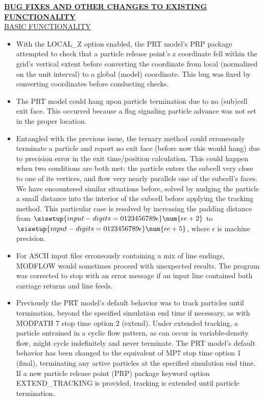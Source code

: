 	\textbf{\underline{BUG FIXES AND OTHER CHANGES TO EXISTING FUNCTIONALITY}} \\
	\underline{BASIC FUNCTIONALITY}
	\begin{itemize}
		\item With the LOCAL\_Z option enabled, the PRT model's PRP package attempted to check that a particle release point's z coordinate fell within the grid's vertical extent before converting the coordinate from local (normalized on the unit interval) to a global (model) coordinate. This bug was fixed by converting coordinates before conducting checks.
		\item The PRT model could hang upon particle termination due to no (sub)cell exit face. This occurred because a flag signaling particle advance was not set in the proper location.
		\item Entangled with the previous issue, the ternary method could erroneously terminate a particle and report no exit face (before now this would hang) due to precision error in the exit time/position calculation. This could happen when two conditions are both met: the particle enters the subcell very close to one of its vertices, and flow very nearly parallels one of the subcell's faces. We have encountered similar situations before, solved by nudging the particle a small distance into the interior of the subcell before applying the tracking method. This particular case is resolved by increasing the padding distance from $\sisetup{input-digits = 0123456789\epsilon} \num{\epsilon e+2}$ to $\sisetup{input-digits = 0123456789\epsilon} \num{\epsilon e+5}$, where $\epsilon$ is machine precision.
		\item For ASCII input files erroneously containing a mix of line endings, MODFLOW would sometimes proceed with unexpected results. The program was corrected to stop with an error message if an input line contained both carriage returns and line feeds.
		\item Previously the PRT model's default behavior was to track particles until termination, beyond the specified simulation end time if necessary, as with MODPATH 7 stop time option 2 (extend). Under extended tracking, a particle entrained in a cyclic flow pattern, as can occur in variable-density flow, might cycle indefinitely and never terminate. The PRT model's default behavior has been changed to the equivalent of MP7 stop time option 1 (final), terminating any active particles at the specified simulation end time. If a new particle release point (PRP) package keyword option EXTEND\_TRACKING is provided, tracking is extended until particle termination.

\end{itemize}

